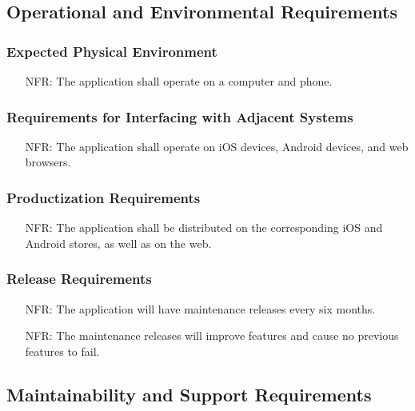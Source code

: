 \documentclass[12pt]{article}
\newcounter{nfrnum} %
\begin{document}
\subsection{Operational and Environmental Requirements}
  \subsubsection{Expected Physical Environment}
    \noident\begin{itemize}
      \item[NFR\refstepcounter{nfrnum}\thenfrnum:] 
        The application shall operate on a computer and phone.  
    \end{itemize}
  \subsubsection{Requirements for Interfacing with Adjacent Systems}
    \noident\begin{itemize}
      \item[NFR\refstepcounter{nfrnum}\thenfrnum:] 
        The application shall operate on iOS devices, Android devices, and web browsers.
    \end{itemize}  
  \subsubsection{Productization Requirements}
    \noident\begin{itemize}
      \item[NFR\refstepcounter{nfrnum}\thenfrnum:] 
        The application shall be distributed on the corresponding iOS and Android stores, as well as on the web.
    \end{itemize} 
  \subsubsection{Release Requirements}
    \noident\begin{itemize}
      \item[NFR\refstepcounter{nfrnum}\thenfrnum:] 
        The application will have maintenance releases every six months.
      \item[NFR\refstepcounter{nfrnum}\thenfrnum:] 
        The maintenance releases will improve features and cause no previous features to fail.
    \end{itemize}  

\subsection{Maintainability and Support Requirements}
\end{document}
